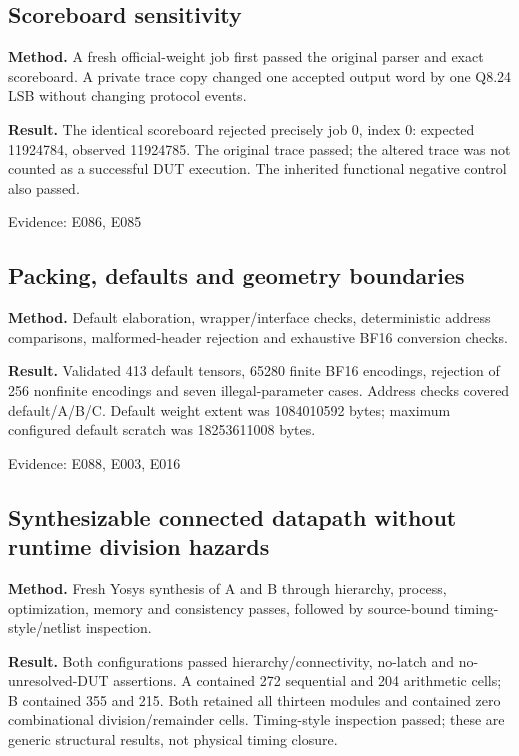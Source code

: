 \documentclass[11pt,a4paper]{article}
\begin{document}
\subsection{Scoreboard sensitivity}

\textbf{Method.} A fresh official-weight job first passed the original parser and exact scoreboard. A private trace copy changed one accepted output word by one Q8.24 LSB without changing protocol events.

\textbf{Result.} The identical scoreboard rejected precisely job 0,\allowbreak{} index 0: expected 11924784,\allowbreak{} observed 11924785. The original trace passed; the altered trace was not counted as a successful DUT execution. The inherited functional negative control also passed.

{\small Evidence: E086,\allowbreak{} E085}

\subsection{Packing,\allowbreak{} defaults and geometry boundaries}

\textbf{Method.} Default elaboration,\allowbreak{} wrapper/\allowbreak{}interface checks,\allowbreak{} deterministic address comparisons,\allowbreak{} malformed-header rejection and exhaustive BF16 conversion checks.

\textbf{Result.} Validated 413 default tensors,\allowbreak{} 65280 finite BF16 encodings,\allowbreak{} rejection of 256 nonfinite encodings and seven illegal-parameter cases. Address checks covered default/\allowbreak{}A/\allowbreak{}B/\allowbreak{}C. Default weight extent was 1084010592 bytes; maximum configured default scratch was 18253611008 bytes.

{\small Evidence: E088,\allowbreak{} E003,\allowbreak{} E016}

\subsection{Synthesizable connected datapath without runtime division hazards}

\textbf{Method.} Fresh Yosys synthesis of A and B through hierarchy,\allowbreak{} process,\allowbreak{} optimization,\allowbreak{} memory and consistency passes,\allowbreak{} followed by source-bound timing-style/\allowbreak{}netlist inspection.

\textbf{Result.} Both configurations passed hierarchy/\allowbreak{}connectivity,\allowbreak{} no-latch and no-unresolved-DUT assertions. A contained 272 sequential and 204 arithmetic cells; B contained 355 and 215. Both retained all thirteen modules and contained zero combinational division/\allowbreak{}remainder cells. Timing-style inspection passed; these are generic structural results,\allowbreak{} not physical timing closure.
\end{document}

